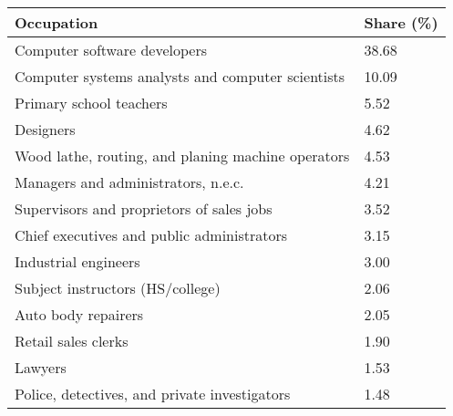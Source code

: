 

\begin{tabular}[t]{ll}
\toprule
Occupation & Share (\%)\\
\midrule
Computer software developers & 38.68\\
Computer systems analysts and computer scientists & 10.09\\
Primary school teachers & 5.52\\
Designers & 4.62\\
Wood lathe, routing, and planing machine operators & 4.53\\
Managers and administrators, n.e.c. & 4.21\\
Supervisors and proprietors of sales jobs & 3.52\\
Chief executives and public administrators & 3.15\\
Industrial engineers & 3.00\\
Subject instructors (HS/college) & 2.06\\
Auto body repairers & 2.05\\
Retail sales clerks & 1.90\\
Lawyers & 1.53\\
Police, detectives, and private investigators & 1.48\\
\bottomrule
\end{tabular}

